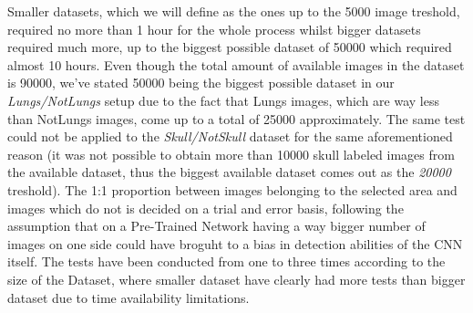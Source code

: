 \documentclass[../main.tex]{subfiles}
\begin{document}
Smaller datasets, which we will define as the ones up to the 5000 image treshold, required no more than 1 hour for the whole process whilst bigger datasets required much more, up to the biggest possible dataset of 50000 which required almost 10 hours. Even though the total amount of available images in the dataset is 90000, we've stated 50000 being the biggest possible dataset in our \textit{Lungs/NotLungs} setup due to the fact that Lungs images, which are way less than NotLungs images, come up to a total of 25000 approximately. The same test could not be applied to the \textit{Skull/NotSkull} dataset for the same aforementioned reason (it was not possible to obtain more than 10000 skull labeled images from the available dataset, thus the biggest available dataset comes out as the \textit{20000} treshold). The 1:1 proportion between images belonging to the selected area and images which do not is decided on a trial and error basis, following the assumption that on a Pre-Trained Network having a way bigger number of images on one side could have broguht to a bias in detection abilities of the CNN itself. The tests have been conducted from one to three times according to the size of the Dataset, where smaller dataset have clearly had more tests than bigger dataset due to time availability limitations.
\end{document}
